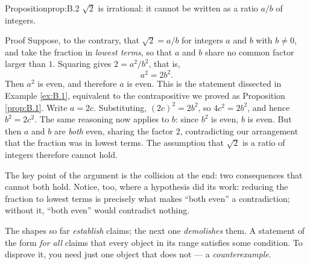 \documentclass[a4paper,12pt,oneside]{memoir}
\begin{document}
\begin{envproposition}{Proposition}{prop:B.2}{}
\(\sqrt{2}\) is irrational: it cannot be written as a ratio \(a/b\) of integers.
\end{envproposition}
\begin{envproof}{Proof}{}{}
Suppose, to the contrary, that \(\sqrt{2} = a/b\) for integers \(a\) and \(b\) with \(b \neq 0\), and take the fraction in \emph{lowest terms}, so that \(a\) and \(b\) share no common factor larger than \(1\). Squaring gives \(2 = a^{2}/b^{2}\), that is, \[ a^{2} = 2b^{2}. \] Then \(a^{2}\) is even, and therefore \(a\) is even. This is the statement dissected in Example \ref{ex:B.1}, equivalent to the contrapositive we proved as Proposition \ref{prop:B.1}. Write \(a = 2c\). Substituting, \((2c)^{2} = 2b^{2}\), so \(4c^{2} = 2b^{2}\), and hence \(b^{2} = 2c^{2}\). The same reasoning now applies to \(b\): since \(b^{2}\) is even, \(b\) is even. But then \(a\) and \(b\) are \emph{both} even, sharing the factor \(2\), contradicting our arrangement that the fraction was in lowest terms. The assumption that \(\sqrt{2}\) is a ratio of integers therefore cannot hold. \qedmark
\end{envproof}
The key point of the argument is the collision at the end: two consequences that cannot both hold. Notice, too, where a hypothesis did its work: reducing the fraction to lowest terms is precisely what makes “both even” a contradiction; without it, “both even” would contradict nothing.

 The shapes so far \emph{establish} claims; the next one \emph{demolishes} them. A statement of the form \emph{for all} claims that every object in its range satisfies some condition. To disprove it, you need just one object that does not — a \emph{counterexample}.
\end{document}
